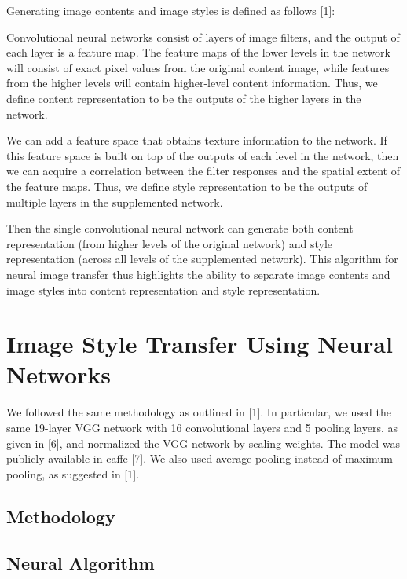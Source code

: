 \documentclass[10pt,twocolumn,letterpaper]{article}
\begin{document}
Generating image contents and image styles is defined as follows [1]:

Convolutional neural networks consist of layers of image filters, and the output of each layer is a feature map. The feature maps of the lower levels in the network will consist of exact pixel values from the original content image, while features from the higher levels will contain higher-level content information. Thus, we define content representation to be the outputs of the higher layers in the network.

We can add a feature space that obtains texture information to the network. If this feature space is built on top of the outputs of each level in the network, then we can acquire a correlation between the filter responses and the spatial extent of the feature maps. Thus, we define style representation to be the outputs of multiple layers in the supplemented network. 

Then the single convolutional neural network can generate both content representation (from higher levels of the original network) and style representation (across all levels of the supplemented network). This algorithm for neural image transfer thus highlights the ability to separate image contents and image styles into content representation and style representation. 

\section{Image Style Transfer Using Neural Networks}

We followed the same methodology as outlined in [1]. In particular, we used the same 19-layer VGG network with 16 convolutional layers and 5 pooling layers, as given in [6], and normalized the VGG network by scaling weights. The model was publicly available in caffe [7]. We also used average pooling instead of maximum pooling, as suggested in [1]. 

\subsection{Methodology}

\subsection{Neural Algorithm}

\end{document}
